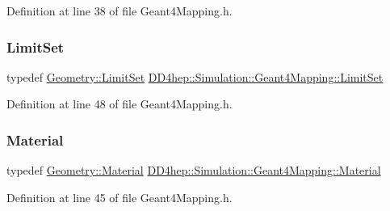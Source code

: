Definition at line 38 of file Geant4\+Mapping.\+h.

\hypertarget{class_d_d4hep_1_1_simulation_1_1_geant4_mapping_a274f93e912e70a162849adb21f54184e}{}\label{class_d_d4hep_1_1_simulation_1_1_geant4_mapping_a274f93e912e70a162849adb21f54184e} 
\subsubsection{\texorpdfstring{Limit\+Set}{LimitSet}}
{\footnotesize\ttfamily typedef \hyperlink{class_d_d4hep_1_1_geometry_1_1_limit_set}{Geometry\+::\+Limit\+Set} \hyperlink{class_d_d4hep_1_1_simulation_1_1_geant4_mapping_a274f93e912e70a162849adb21f54184e}{D\+D4hep\+::\+Simulation\+::\+Geant4\+Mapping\+::\+Limit\+Set}}



Definition at line 48 of file Geant4\+Mapping.\+h.

\hypertarget{class_d_d4hep_1_1_simulation_1_1_geant4_mapping_a2539031128388f894af24898eb6189a7}{}\label{class_d_d4hep_1_1_simulation_1_1_geant4_mapping_a2539031128388f894af24898eb6189a7} 
\subsubsection{\texorpdfstring{Material}{Material}}
{\footnotesize\ttfamily typedef \hyperlink{class_d_d4hep_1_1_geometry_1_1_material}{Geometry\+::\+Material} \hyperlink{class_d_d4hep_1_1_simulation_1_1_geant4_mapping_a2539031128388f894af24898eb6189a7}{D\+D4hep\+::\+Simulation\+::\+Geant4\+Mapping\+::\+Material}}



Definition at line 45 of file Geant4\+Mapping.\+h.

\hypertarget{class_d_d4hep_1_1_simulation_1_1_geant4_mapping_a2cad95da5f969a6b67fb6d6944549ad6}{}\label{class_d_d4hep_1_1_simulation_1_1_geant4_mapping_a2cad95da5f969a6b67fb6d6944549ad6} 
